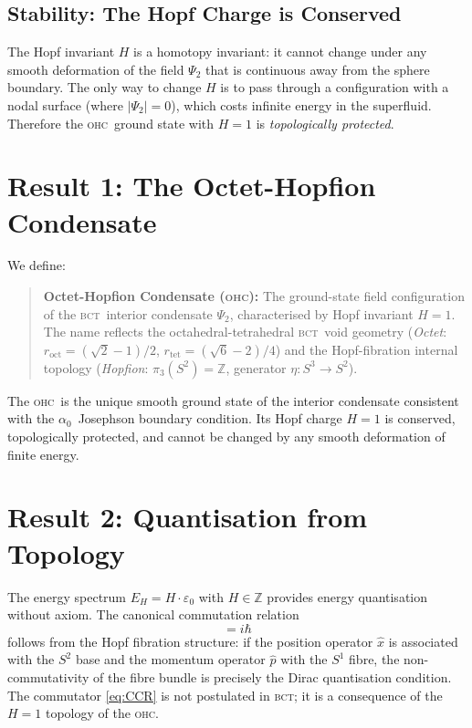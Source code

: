 \documentclass[aps,prl,preprint,superscriptaddress,floatfix]{revtex4-2}
\newcommand{\roct}{r_{\mathrm{oct}}}
\newcommand{\rtet}{r_{\mathrm{tet}}}
\newcommand{\az}{\alpha_0}
\newcommand{\BCT}{\textsc{bct}}
\newcommand{\OHC}{\textsc{ohc}}
\newcommand{\Psiint}{\Psi_2}
\newcommand{\HopfN}{H}
\begin{document}
\subsection{Stability: The Hopf Charge is Conserved}

The Hopf invariant $\HopfN$ is a homotopy invariant: it cannot change
under any smooth deformation of the field $\Psiint$ that is continuous
away from the sphere boundary.
The only way to change $\HopfN$ is to pass through a configuration with
a nodal surface (where $|\Psiint|=0$), which costs infinite energy in
the superfluid.
Therefore the \OHC\ ground state with $\HopfN=1$ is \emph{topologically
protected}.

\section{Result 1: The Octet-Hopfion Condensate}
\label{sec:OHC}

We define:

\begin{quote}
\textbf{Octet-Hopfion Condensate (\OHC):} The ground-state field
configuration of the \BCT\ interior condensate $\Psiint$, characterised
by Hopf invariant $\HopfN=1$.
The name reflects the octahedral-tetrahedral \BCT\ void geometry
(\emph{Octet}: $\roct = (\sqrt{2}-1)/2$, $\rtet = (\sqrt{6}-2)/4$)
and the Hopf-fibration internal topology (\emph{Hopfion}:
$\pi_3(S^2)=\mathbb{Z}$, generator $\eta:S^3\to S^2$).
\end{quote}

The \OHC\ is the unique smooth ground state of the interior condensate
consistent with the $\az$~Josephson boundary condition.
Its Hopf charge $\HopfN=1$ is conserved, topologically protected,
and cannot be changed by any smooth deformation of finite energy.

\section{Result 2: Quantisation from Topology}
\label{sec:quantisation}

The energy spectrum $E_{\HopfN} = \HopfN\cdot\varepsilon_0$ with
$\HopfN\in\mathbb{Z}$ provides energy quantisation without axiom.
The canonical commutation relation
\begin{equation}
  [\hat{x},\hat{p}] = i\hbar
  \label{eq:CCR}
\end{equation}
follows from the Hopf fibration structure: if the position operator
$\hat{x}$ is associated with the $S^2$ base and the momentum operator
$\hat{p}$ with the $S^1$ fibre, the non-commutativity of the fibre
bundle is precisely the Dirac quantisation condition.
The commutator \eqref{eq:CCR} is not postulated in \BCT; it is a
consequence of the $\HopfN=1$ topology of the \OHC.
\end{document}
